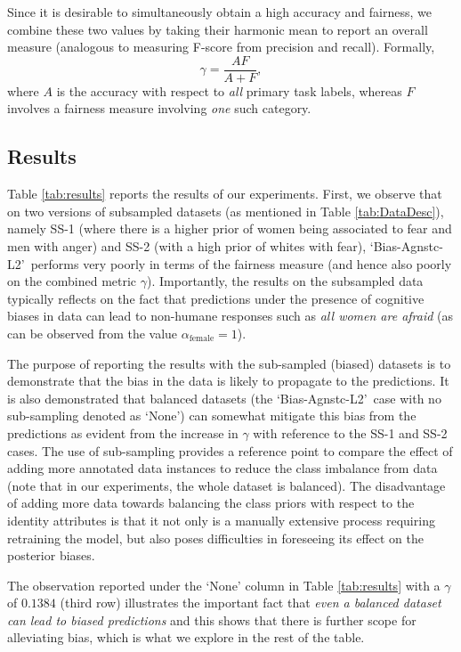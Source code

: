 \documentclass[letterpaper]{article}
\newcommand{\STWR}{`Bias-Agnstc-L2'~}
\begin{document}
Since it is desirable to simultaneously obtain a high accuracy and fairness, we combine these two values by taking their harmonic mean to report an overall measure (analogous to measuring F-score from precision and recall). Formally,
\begin{equation}
\gamma = \frac{AF}{A+F},    
\end{equation}
where $A$ is the accuracy with respect to \emph{all} primary task labels, whereas $F$ involves a fairness measure involving \emph{one} such category.


\subsection{Results}

Table \ref{tab:results} reports the results of our experiments. 
First, we observe that on two versions of subsampled datasets (as mentioned in Table \ref{tab:DataDesc}), namely SS-1 (where there is a higher prior of women being associated to fear and men with anger) and SS-2 (with a high prior of whites with fear),
\STWR performs very poorly in terms of the fairness measure (and hence also poorly on the combined metric $\gamma$). Importantly, the results on the subsampled data typically reflects on the fact that predictions under the presence of cognitive biases in data can lead to non-humane responses such as \emph{all women are afraid} (as can be observed from the value $\alpha_{\mathrm{female}}=1$).

The purpose of reporting the results with the sub-sampled (biased) datasets is to demonstrate that the bias in the data is likely to propagate to the predictions. It is also demonstrated that balanced datasets (the \STWR case with no sub-sampling denoted as `None') can somewhat mitigate this bias from the predictions as evident from the increase in $\gamma$ with reference to the SS-1 and SS-2 cases. The use of sub-sampling provides a reference point to compare the effect of adding more annotated data instances to reduce the class imbalance from data (note that in our experiments, the whole dataset is balanced). The disadvantage of adding more data towards balancing the class priors with respect to the identity attributes is that it not only is a manually extensive process requiring retraining the model, but also poses difficulties in foreseeing its effect on the posterior biases.

The observation reported under the `None' column in Table \ref{tab:results} with a $\gamma$ of $0.1384$ (third row) illustrates the important fact that \emph{even a balanced dataset can lead to biased predictions} and this shows that there is further scope for alleviating bias, which is what we explore in the rest of the table.  
\end{document}
